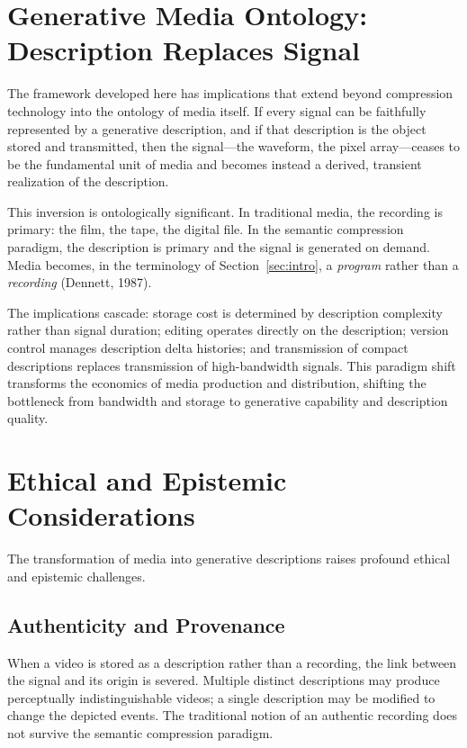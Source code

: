 \documentclass[11pt,a4paper]{article}
\theoremstyle{definition}
\theoremstyle{remark}
\begin{document}
\section{Generative Media Ontology: Description Replaces Signal}
\label{sec:ontology}

The framework developed here has implications that extend beyond compression technology into the ontology of media itself. If every signal can be faithfully represented by a generative description, and if that description is the object stored and transmitted, then the signal---the waveform, the pixel array---ceases to be the fundamental unit of media and becomes instead a derived, transient realization of the description.

This inversion is ontologically significant. In traditional media, the recording is primary: the film, the tape, the digital file. In the semantic compression paradigm, the description is primary and the signal is generated on demand. Media becomes, in the terminology of Section~\ref{sec:intro}, a \emph{program} rather than a \emph{recording} (Dennett, 1987).

The implications cascade: storage cost is determined by description complexity rather than signal duration; editing operates directly on the description; version control manages description delta histories; and transmission of compact descriptions replaces transmission of high-bandwidth signals. This paradigm shift transforms the economics of media production and distribution, shifting the bottleneck from bandwidth and storage to generative capability and description quality.

\section{Ethical and Epistemic Considerations}
\label{sec:ethics}

The transformation of media into generative descriptions raises profound ethical and epistemic challenges.

\subsection{Authenticity and Provenance}

When a video is stored as a description rather than a recording, the link between the signal and its origin is severed. Multiple distinct descriptions may produce perceptually indistinguishable videos; a single description may be modified to change the depicted events. The traditional notion of an authentic recording does not survive the semantic compression paradigm.
\end{document}
